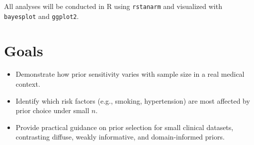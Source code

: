 \documentclass[11pt]{article}
\begin{document}
All analyses will be conducted in R using \texttt{rstanarm} and
visualized with \texttt{bayesplot} and \texttt{ggplot2}.

\section*{Goals}

\begin{itemize}
    \item Demonstrate how prior sensitivity varies with sample size
    in a real medical context.
    \item Identify which risk factors (e.g., smoking, hypertension)
    are most affected by prior choice under small $n$.
    \item Provide practical guidance on prior selection for small
    clinical datasets, contrasting diffuse, weakly informative,
    and domain-informed priors.
\end{itemize}
\end{document}
